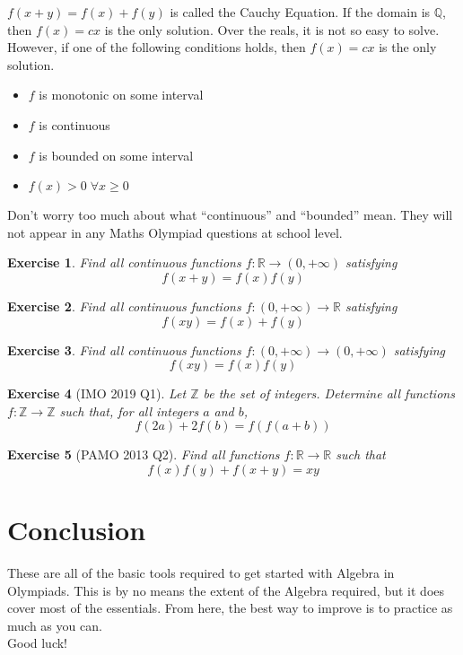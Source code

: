\documentclass[a4paper,12pt]{article}
\newtheorem{exercise}{Exercise}[section]
\begin{document}
$f(x + y) = f(x) + f(y)$ is called the Cauchy Equation. If the domain is $\mathbb{Q}$, then $f(x) = cx$ is the only solution. Over the reals, it is not so easy to solve. However, if one of the following conditions holds, then $f(x) = cx$ is the only solution.
\begin{itemize}
    \item $f$ is monotonic on some interval
    \item $f$ is continuous
    \item $f$ is bounded on some interval
    \item $f(x) > 0 \; \forall x \ge 0$
\end{itemize}

Don't worry too much about what ``continuous'' and ``bounded'' mean. They will not appear in any Maths Olympiad questions at school level.

\begin{exercise}
    Find all continuous functions $f: \mathbb{R} \rightarrow (0, +\infty)$ satisfying
    $$f(x + y) = f(x)f(y)$$
\end{exercise}
\begin{exercise}
    Find all continuous functions $f: (0, +\infty) \rightarrow \mathbb{R}$ satisfying
    $$f(xy) = f(x) + f(y)$$
\end{exercise}
\begin{exercise}
    Find all continuous functions $f: (0, +\infty) \rightarrow (0, +\infty)$ satisfying
    $$f(xy) = f(x)f(y)$$
\end{exercise}
\begin{exercise}[IMO 2019 Q1]
    Let $\mathbb{Z}$ be the set of integers. Determine all functions $f: \mathbb{Z} \rightarrow \mathbb{Z}$ such that, for all integers $a$ and $b$,
    $$f(2a) + 2f(b) = f(f(a + b))$$
\end{exercise}
\begin{exercise}[PAMO 2013 Q2]
    Find all functions $f: \mathbb{R} \rightarrow \mathbb{R}$ such that
    $$f(x)f(y) + f(x + y) = xy$$
\end{exercise}

\clearpage
\section{Conclusion}
These are all of the basic tools required to get started with Algebra in Olympiads. This is by no means the extent of the Algebra required, but it does cover most of the essentials. From here, the best way to improve is to practice as much as you can.\\ Good luck!
\end{document}
